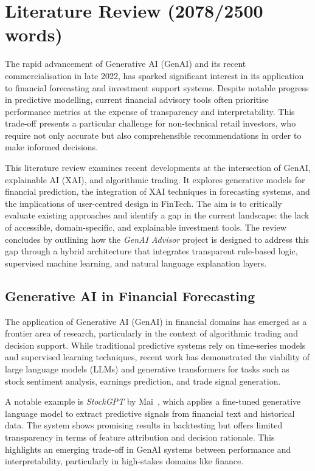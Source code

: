 \section{Literature Review (2078/2500 words)}

The rapid advancement of Generative AI (GenAI) and its recent commercialisation in late 2022, has sparked significant interest in its application to financial forecasting and investment support systems. Despite notable progress in predictive modelling, current financial advisory tools often prioritise performance metrics at the expense of transparency and interpretability. This trade-off presents a particular challenge for non-technical retail investors, who require not only accurate but also comprehensible recommendations in order to make informed decisions.

This literature review examines recent developments at the intersection of GenAI, explainable AI (XAI), and algorithmic trading. It explores generative models for financial prediction, the integration of XAI techniques in forecasting systems, and the implications of user-centred design in FinTech. The aim is to critically evaluate existing approaches and identify a gap in the current landscape: the lack of accessible, domain-specific, and explainable investment tools. The review concludes by outlining how the \textit{GenAI Advisor} project is designed to address this gap through a hybrid architecture that integrates transparent rule-based logic, supervised machine learning, and natural language explanation layers.

\subsection{Generative AI in Financial Forecasting}

The application of Generative AI (GenAI) in financial domains has emerged as a frontier area of research, particularly in the context of algorithmic trading and decision support. While traditional predictive systems rely on time-series models and supervised learning techniques, recent work has demonstrated the viability of large language models (LLMs) and generative transformers for tasks such as stock sentiment analysis, earnings prediction, and trade signal generation.

A notable example is \textit{StockGPT} by Mai~\cite{mai2024stockgpt}, which applies a fine-tuned generative language model to extract predictive signals from financial text and historical data. The system shows promising results in backtesting but offers limited transparency in terms of feature attribution and decision rationale. This highlights an emerging trade-off in GenAI systems between performance and interpretability, particularly in high-stakes domains like finance.

